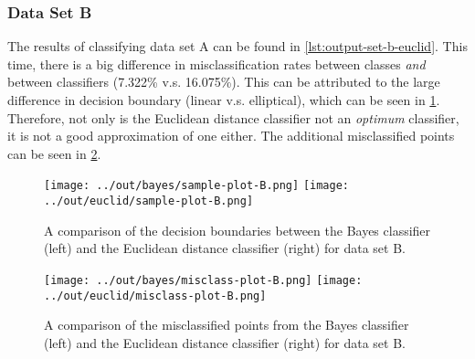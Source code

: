\documentclass[headings=optiontoheadandtoc,listof=totoc,parskip=full]{scrartcl}
\begin{document}
\subsubsection{Data Set B}

The results of classifying data set A can be found in \cref{lst:output-set-b-euclid}. This time, there is a big difference in misclassification rates between classes \emph{and} between classifiers (7.322\% v.s. 16.075\%). This can be attributed to the large difference in decision boundary (linear v.s. elliptical), which can be seen in \cref{fig:sample-comparison-B}. Therefore, not only is the Euclidean distance classifier not an \emph{optimum} classifier, it is not a good approximation of one either. The additional misclassified points can be seen in \cref{fig:misclass-comparison-B}.



\begin{figure}[H]
	\centering
	\texttt{[image: ../out/bayes/sample-plot-B.png]}
	\texttt{[image: ../out/euclid/sample-plot-B.png]}
	\caption{A comparison of the decision boundaries between the Bayes classifier (left) and the Euclidean distance classifier (right) for data set B.}
	\label{fig:sample-comparison-B}
\end{figure}


\begin{figure}[H]
	\centering
	\texttt{[image: ../out/bayes/misclass-plot-B.png]}
	\texttt{[image: ../out/euclid/misclass-plot-B.png]}
	\caption{A comparison of the misclassified points from the Bayes classifier (left) and the Euclidean distance classifier (right) for data set B.}
	\label{fig:misclass-comparison-B}
\end{figure}
\end{document}
